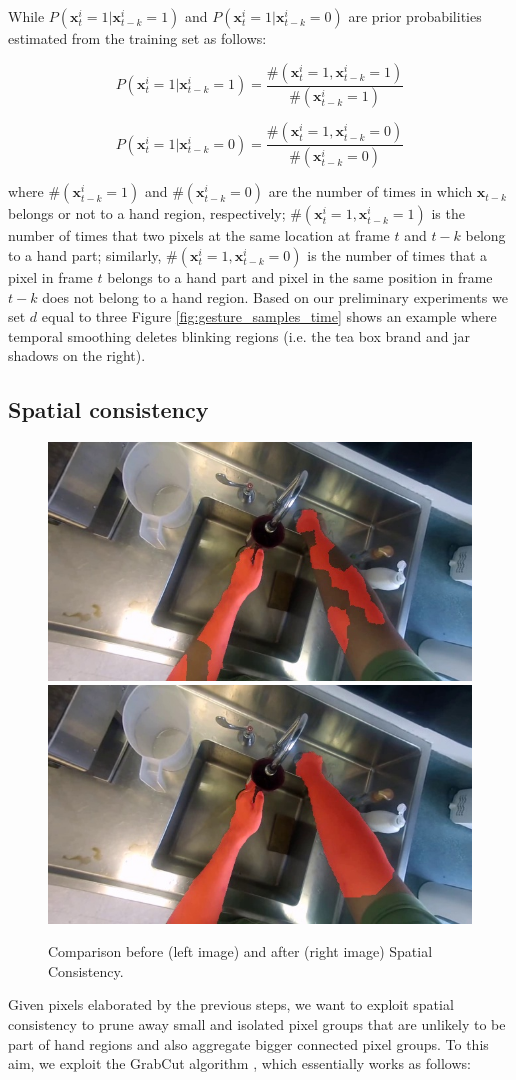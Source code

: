 While $P(\mathbf{x}_{t}^{i}=1|\mathbf{x}_{t-k}^{i}=1)$ and $P(\mathbf{x}_{t}^{i}=1|\mathbf{x}_{t-k}^{i}=0)$ are prior probabilities estimated
from the training set as follows:

\[
P(\mathbf{x}_{t}^{i}=1|\mathbf{x}_{t-k}^{i}=1)=\frac{\#(\mathbf{x}_{t}^{i}=1,\mathbf{x}_{t-k}^{i}=1)}{\#(\mathbf{x}_{t-k}^{i}=1)}
\]


\[
P(\mathbf{x}_{t}^{i}=1|\mathbf{x}_{t-k}^{i}=0)=\frac{\#(\mathbf{x}_{t}^{i}=1,\mathbf{x}_{t-k}^{i}=0)}{\#(\mathbf{x}_{t-k}^{i}=0)}
\]


where $\#(\mathbf{x}_{t-k}^{i}=1)$ and $\#(\mathbf{x}_{t-k}^{i}=0)$ are the number of times in which $\mathbf{x}_{t-k}$ belongs or not to
a hand region, respectively; $\#(\mathbf{x}_{t}^{i}=1,\mathbf{x}_{t-k}^{i}=1)$ is the number
of times that two pixels at the same location at frame $t$ and $t-k$ belong to a hand part; 
similarly, $\#(\mathbf{x}_{t}^{i}=1,\mathbf{x}_{t-k}^{i}=0)$
is the number of times that a pixel in frame $t$ belongs to
a hand part and pixel in the same position in frame $t-k$ does not belong
to a hand region. Based on our preliminary experiments we set $d$ equal to three
Figure \ref{fig:gesture_samples_time} shows an example where temporal smoothing deletes blinking regions (i.e. the tea box brand and jar shadows on the right).


\subsection{Spatial consistency}
\begin{figure}[tb]
\centering
\includegraphics[width=.45\columnwidth]{./Figures/context-free1.jpg}
\includegraphics[width=.45\columnwidth]{./Figures/context-dependent1.jpg}
\caption{Comparison before (left image) and after (right image) Spatial Consistency.}
\label{fig:gesture_samples_space}
\end{figure}
Given pixels elaborated by the previous steps, we want to exploit spatial consistency to prune away small and isolated pixel groups that are unlikely to be part of hand regions and also aggregate bigger connected pixel groups. To this aim, we exploit the GrabCut algorithm \cite{rother04}, which essentially works as follows:

